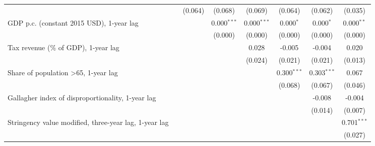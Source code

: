\begin{table}[htbp]
\begin{tabular}{lccccccc}
                                                                                                  &              & (0.064)      & (0.068)       & (0.069)       & (0.064)        & (0.062)        & (0.035)\\   
      GDP p.c. (constant 2015 USD), 1-year lag                                                    &              &              & 0.000$^{***}$ & 0.000$^{***}$ & 0.000$^{*}$    & 0.000$^{*}$    & 0.000$^{**}$\\   
                                                                                                  &              &              & (0.000)       & (0.000)       & (0.000)        & (0.000)        & (0.000)\\   
      Tax revenue (\% of GDP), 1-year lag                                                         &              &              &               & 0.028         & -0.005         & -0.004         & 0.020\\   
                                                                                                  &              &              &               & (0.024)       & (0.021)        & (0.021)        & (0.013)\\   
      Share of population >65, 1-year lag                                                         &              &              &               &               & 0.300$^{***}$  & 0.303$^{***}$  & 0.067\\   
                                                                                                  &              &              &               &               & (0.068)        & (0.067)        & (0.046)\\   
      Gallagher index of disproportionality, 1-year lag                                           &              &              &               &               &                & -0.008         & -0.004\\   
                                                                                                  &              &              &               &               &                & (0.014)        & (0.007)\\   
      Stringency value modified, three-year lag, 1-year lag                                       &              &              &               &               &                &                & 0.701$^{***}$\\   
                                                                                                  &              &              &               &               &                &                & (0.027)\\   

\end{tabular}
\end{table}
